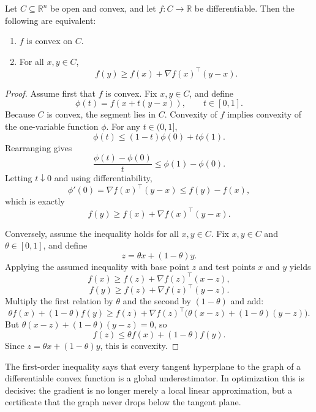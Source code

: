 \begin{theorem}\label{thm:l1-first-order-characterization-of-convexity}
	Let $C \subseteq \mathbb{R}^n$ be open and convex, and let $f:C \to \mathbb{R}$ be differentiable. Then the following are equivalent:
	\begin{enumerate}[label=(\roman*)]
		\item $f$ is convex on $C$.
		\item For all $x,y \in C$,
		      \[
			      f(y) \ge f(x) + \nabla f(x)^\top (y-x).
		      \]
	\end{enumerate}
\end{theorem}
\begin{proof}
	Assume first that $f$ is convex. Fix $x,y \in C$, and define
	\[
		\phi(t) = f(x+t(y-x)), \qquad t \in [0,1].
	\]
	Because $C$ is convex, the segment lies in $C$. Convexity of $f$ implies convexity of the one-variable function $\phi$. For any $t \in (0,1]$,
	\[
		\phi(t) \le (1-t)\phi(0) + t \phi(1).
	\]
	Rearranging gives
	\[
		\frac{\phi(t)-\phi(0)}{t} \le \phi(1)-\phi(0).
	\]
	Letting $t \downarrow 0$ and using differentiability,
	\[
		\phi'(0) = \nabla f(x)^\top (y-x) \le f(y)-f(x),
	\]
	which is exactly
	\[
		f(y) \ge f(x) + \nabla f(x)^\top (y-x).
	\]

	Conversely, assume the inequality holds for all $x,y \in C$. Fix $x,y \in C$ and $\theta \in [0,1]$, and define
	\[
		z = \theta x + (1-\theta)y.
	\]
	Applying the assumed inequality with base point $z$ and test points $x$ and $y$ yields
	\[
		f(x) \ge f(z) + \nabla f(z)^\top (x-z),
	\]
	\[
		f(y) \ge f(z) + \nabla f(z)^\top (y-z).
	\]
	Multiply the first relation by $\theta$ and the second by $(1-\theta)$ and add:
	\[
		\theta f(x) + (1-\theta)f(y)
		\ge f(z) + \nabla f(z)^\top \bigl(\theta(x-z) + (1-\theta)(y-z)\bigr).
	\]
	But $\theta(x-z)+(1-\theta)(y-z)=0$, so
	\[
		f(z) \le \theta f(x) + (1-\theta)f(y).
	\]
	Since $z = \theta x + (1-\theta)y$, this is convexity.
\end{proof}

\begin{remark}
	The first-order inequality says that every tangent hyperplane to the graph of a differentiable convex function is a global underestimator. In optimization this is decisive: the gradient is no longer merely a local linear approximation, but a certificate that the graph never drops below the tangent plane.
\end{remark}

